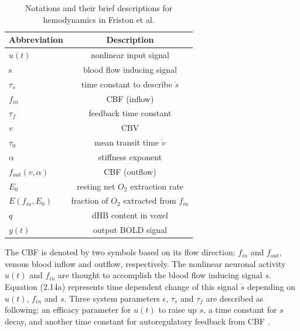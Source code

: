\begin{table}[h]
\begin{center}
\caption[BOLD Abbreviations]{Notations and their brief descriptions for hemodynamics in Friston et al. }
\begin{tabular}{ l | c }
  Abbreviation & Description \\
  \hline  \hline                     
  $u(t)$ &      nonlinear input signal  
\\ \hline

  s & blood flow inducing signal 
\\ \hline
  $\tau_s$ & time constant to describe $\dot{s}$  
\\ \hline  
  $f_{in}$ & CBF (inflow) 
 \\ \hline
 $\tau_f$  & feedback time constant 
\\ \hline  
 $v$    & CBV    
\\ \hline
 $\tau_0$  & mean transit time $\dot{v}$    
\\ \hline 
 $\alpha$  & stiffness exponent
\\ \hline 

  $f_{out}(v, \alpha)$ & CBF (outflow) 
\\ \hline
 $E_0$  & resting net $O_2$ extraction rate 
\\ \hline
 $E(f_{in}, E_0)$    & fraction of $O_2$ extracted from $f_{in}$    
\\ \hline
 $q$    &  dHB content in voxel 
\\ \hline
 $y(t)$    &  output BOLD signal          \\
\hline  
  \hline 
 
\end{tabular}
\label{table:BOLD Abbreviations}
\end{center}
\end{table}	


The CBF is denoted by two symbols based on its flow direction: $f_{in}$ and $f_{out}$, venous blood inflow and outflow, respectively. The nonlinear neuronal activity $u(t)$ and $f_{in}$ are thought to accomplish the blood flow inducing signal $s$. Equation (2.14a) represents time dependent change of this signal $\dot{s}$ depending on $u(t)$, $f_{in}$ and $s$. Three system parameters $\epsilon$, $\tau_s$ and $\tau_f$ are described as following: an efficacy parameter for $u(t)$ to raise up $s$, a time constant for $s$ decay, and another time constant for autoregulatory feedback from CBF \citep{XYZ1994, XYZ1998}.

